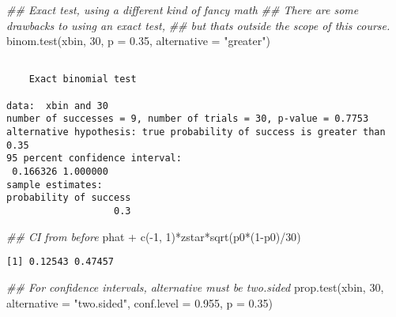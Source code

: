 \documentclass[
  letterpaper,
  DIV=11,
  numbers=noendperiod]{scrreprt}
\newenvironment{Shaded}{\begin{snugshade}}{\end{snugshade}}
\newcommand{\AttributeTok}[1]{\textcolor[rgb]{0.40,0.45,0.13}{#1}}
\newcommand{\DecValTok}[1]{\textcolor[rgb]{0.68,0.00,0.00}{#1}}
\newcommand{\DocumentationTok}[1]{\textcolor[rgb]{0.37,0.37,0.37}{\textit{#1}}}
\newcommand{\FloatTok}[1]{\textcolor[rgb]{0.68,0.00,0.00}{#1}}
\newcommand{\FunctionTok}[1]{\textcolor[rgb]{0.28,0.35,0.67}{#1}}
\newcommand{\NormalTok}[1]{\textcolor[rgb]{0.00,0.23,0.31}{#1}}
\newcommand{\SpecialCharTok}[1]{\textcolor[rgb]{0.37,0.37,0.37}{#1}}
\newcommand{\StringTok}[1]{\textcolor[rgb]{0.13,0.47,0.30}{#1}}
\begin{document}
\begin{Shaded}
\begin{Highlighting}[]
\DocumentationTok{\#\# Exact test, using a different kind of fancy math}
\DocumentationTok{\#\# There are some drawbacks to using an exact test,}
\DocumentationTok{\#\# but that\textquotesingle{}s outside the scope of this course.}
\FunctionTok{binom.test}\NormalTok{(xbin, }\DecValTok{30}\NormalTok{, }\AttributeTok{p =} \FloatTok{0.35}\NormalTok{, }\AttributeTok{alternative =} \StringTok{"greater"}\NormalTok{)}
\end{Highlighting}
\end{Shaded}

\begin{verbatim}

    Exact binomial test

data:  xbin and 30
number of successes = 9, number of trials = 30, p-value = 0.7753
alternative hypothesis: true probability of success is greater than 0.35
95 percent confidence interval:
 0.166326 1.000000
sample estimates:
probability of success 
                   0.3 
\end{verbatim}

\begin{Shaded}
\begin{Highlighting}[]
\DocumentationTok{\#\# CI from before }
\NormalTok{phat }\SpecialCharTok{+} \FunctionTok{c}\NormalTok{(}\SpecialCharTok{{-}}\DecValTok{1}\NormalTok{, }\DecValTok{1}\NormalTok{)}\SpecialCharTok{*}\NormalTok{zstar}\SpecialCharTok{*}\FunctionTok{sqrt}\NormalTok{(p0}\SpecialCharTok{*}\NormalTok{(}\DecValTok{1}\SpecialCharTok{{-}}\NormalTok{p0)}\SpecialCharTok{/}\DecValTok{30}\NormalTok{)}
\end{Highlighting}
\end{Shaded}

\begin{verbatim}
[1] 0.12543 0.47457
\end{verbatim}

\begin{Shaded}
\begin{Highlighting}[]
\DocumentationTok{\#\# For confidence intervals, alternative must be two.sided}
\FunctionTok{prop.test}\NormalTok{(xbin, }\DecValTok{30}\NormalTok{, }\AttributeTok{alternative =} \StringTok{"two.sided"}\NormalTok{, }\AttributeTok{conf.level =} \FloatTok{0.955}\NormalTok{, }\AttributeTok{p =} \FloatTok{0.35}\NormalTok{)}
\end{Highlighting}
\end{Shaded}
\end{document}
